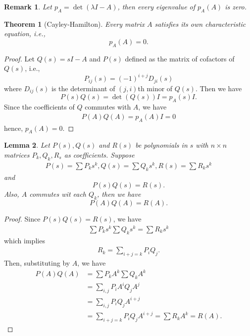 \documentclass[11pt]{book}
\newtheorem{theorem}{Theorem}[section]
\newtheorem{lemma}[theorem]{Lemma}
\newtheorem{remark}{Remark}[section]
\theoremstyle{definition}
\numberwithin{equation}{chapter}
\begin{document}
\begin{remark}
Let $p_A = \det(\lambda I - A)$, then every eigenvalue of $p_A(A)$ is zero.
\end{remark}

\medskip

\begin{theorem}[Cayley-Hamilton]
Every matrix $A$ satisfies its own characteristic equation, i.e.,
$$p_A(A) = 0.$$
\end{theorem}
\begin{proof}
Let $Q(s) = sI - A$ and $P(s)$ defined as the matrix of cofactors of $Q(s)$, i.e., 
$$P_{ij}(s) = (-1)^{i+j}D_{ji}(s)$$
where $D_{ij}(s)$ is the determinant of $(j,i)$th minor of $Q(s)$. Then we have 
$$P(s)Q(s) = \det (Q(s)) I = p_A(s)I.$$
Since the coefficients of $Q$ commutes with $A$, we have 
\begin{align*}
    P(A)Q(A) = p_A(A)I = 0
\end{align*}
hence, $p_A(A) = 0$.
\end{proof}

\medskip

\begin{lemma}
Let $P(s), Q(s)$ and $R(s)$ be polynomials in $s$ with $n\times n$ matrices $P_k, Q_k, R_s$ as coefficients. Suppose
\begin{align*}
    P(s) = \sum P_k s^k, Q(s) = \sum Q_k s^k, R(s) = \sum R_k s^k
\end{align*}
and 
$$P(s)Q(s) = R(s).$$
Also, $A$ commutes wit each $Q_k$, then we have 
$$P(A)Q(A) = R(A).$$
\end{lemma}
\begin{proof}
Since $P(s)Q(s) = R(s)$, we have
\begin{align*}
    \sum P_k s^k \sum Q_k s^k = \sum R_k s^k
\end{align*}
which implies 
\begin{align*}
    R_k = \sum_{i+j=k} P_i Q_j.
\end{align*}
Then, substituting by $A$, we have
\begin{align*}
    P(A)Q(A) & = \sum P_k A^k \sum Q_k A^k \\
    & = \sum_{i,j} P_i A^i Q_j A^j \\
    & = \sum_{i,j} P_i Q_j A^{i+j} \\
    & = \sum_{i+j=k} P_i Q_j A^{i+j} = \sum R_k A^k = R(A).
\end{align*}
\end{proof}

\medskip
\end{document}
